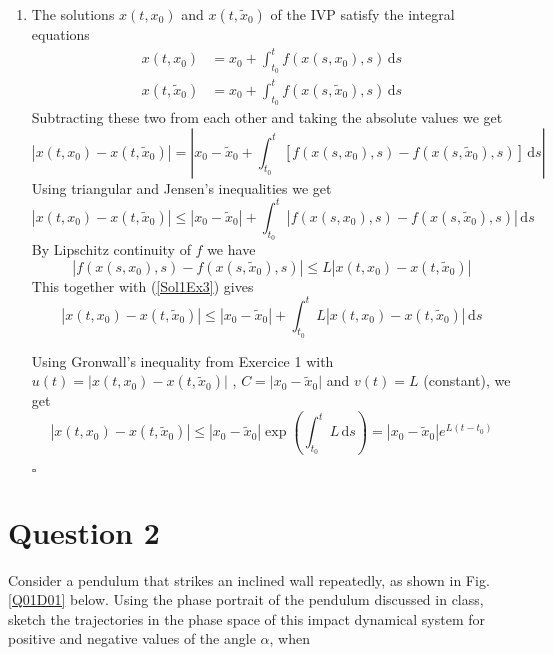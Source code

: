 \documentclass[twoside,10pt,a4paper]{article}
\begin{document}
\begin{enumerate}[label=(\arabic*)]
\item The solutions $x(t,x_0)$ and $x(t,\tilde{x}_0)$ of the IVP satisfy the integral equations
\begin{align*}
	x(t,x_0) &= x_0 + \int_{t_0}^t f(x(s,x_0),s)\,\text{d}s \\
	x(t,\tilde{x}_0) &= x_0 + \int_{t_0}^t f(x(s,\tilde{x}_0),s)\,\text{d}s
\end{align*}
Subtracting these two from each other and taking the absolute values we get
\begin{equation*}
	\left\vert x(t,x_0) - x(t,\tilde{x}_0) \right\vert = \left\vert x_0 - \tilde{x}_0 + \int_{t_0}^t \left[ f(x(s,x_0),s) - f(x(s,\tilde{x}_0),s) \right]\,\text{d}s \right\vert
\end{equation*}
Using triangular and Jensen's inequalities we get
\begin{equation}\label{Sol1Ex3}
	\left\vert x(t,x_0) - x(t,\tilde{x}_0) \right\vert \leq \left\vert x_0 - \tilde{x}_0 \right\vert + \int_{t_0}^t \left\vert f(x(s,x_0),s) - f(x(s,\tilde{x}_0),s) \right\vert\,\text{d}s
\end{equation}
By Lipschitz continuity of $f$ we have
\begin{equation*}
	\left\vert f(x(s,x_0),s) - f(x(s,\tilde{x}_0),s) \right\vert \leq L \left\vert x(t,x_0) - x(t,\tilde{x}_0) \right\vert
\end{equation*}
This together with (\ref{Sol1Ex3}) gives
\begin{equation*}
	\left\vert x(t,x_0) - x(t,\tilde{x}_0) \right\vert \leq \left\vert x_0 - \tilde{x}_0 \right\vert + \int_{t_0}^t L \left\vert x(t,x_0) - x(t,\tilde{x}_0) \right\vert\,\text{d}s
\end{equation*}

Using Gronwall's inequality from Exercice 1 with
$u(t) = \vert x(t,x_0) - x(t,\tilde{x}_0) \vert$ , $C = \vert x_0 - \tilde{x}_0 \vert$ and $v(t) = L$ (constant), we get
\begin{equation*}
	\left\vert x(t,x_0) - x(t,\tilde{x}_0) \right\vert \leq \left\vert x_0 - \tilde{x}_0 \right\vert \exp \left( \int_{t_0}^t L\,\text{d}s \right) = \left\vert x_0 - \tilde{x}_0 \right\vert e^{L(t-t_0)}
\end{equation*}
\begin{flushright}
	$\square$
\end{flushright}

\end{enumerate}

\newpage

\section*{Question 2}
Consider a pendulum that strikes an inclined wall repeatedly, as shown in Fig. \ref{Q01D01} below. Using the phase portrait of the pendulum discussed in class, sketch the trajectories in the phase space of this impact dynamical system for positive and negative values of the angle $\alpha$, when
\end{document}
